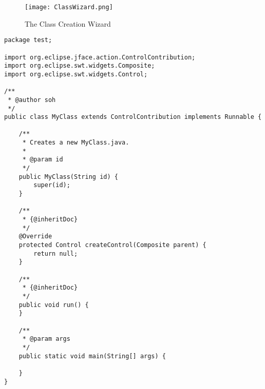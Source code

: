 \begin{figure}[ClassWizard]
  \centering
  \texttt{[image: ClassWizard.png]}
  \caption[The Class Creation Wizard]%
  {The Class Creation Wizard\protect\footnotemark}
  \label{fig:ClassWizard}
\end{figure}

\lstset{
  language=Java,
}
\begin{lstlisting}[caption={Code generated by the wizard},label={fig:classCreationGenerated}]
package test;

import org.eclipse.jface.action.ControlContribution;
import org.eclipse.swt.widgets.Composite;
import org.eclipse.swt.widgets.Control;

/**
 * @author soh
 */
public class MyClass extends ControlContribution implements Runnable {

    /**
     * Creates a new MyClass.java.
     * 
     * @param id
     */
    public MyClass(String id) {
        super(id);
    }

    /**
     * {@inheritDoc}
     */
    @Override
    protected Control createControl(Composite parent) {
        return null;
    }

    /**
     * {@inheritDoc}
     */
    public void run() {
    }

    /**
     * @param args
     */
    public static void main(String[] args) {

    }
}
\end{lstlisting}


